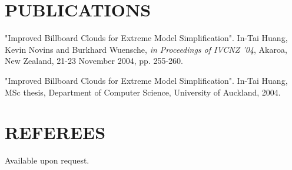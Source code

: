 \begin{resume}
\section{PUBLICATIONS} 
\vspace{0.1in}

"Improved Billboard Clouds for Extreme Model Simplification". In-Tai Huang, Kevin Novins and Burkhard Wuensche, \textit{in Proceedings of IVCNZ '04}, Akaroa, New Zealand, 21-23 November 2004, pp. 255-260. 

"Improved Billboard Clouds for Extreme Model Simplification". In-Tai Huang, MSc thesis, Department of Computer Science, University of Auckland, 2004.

\section{REFEREES} 
\vspace{0.1in}

Available upon request.
 
\end{resume}































